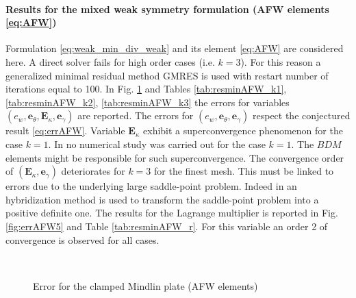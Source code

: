 \paragraph{Results for the mixed weak symmetry formulation (AFW elements \eqref{eq:AFW})} 
Formulation \eqref{eq:weak_min_div_weak} and its element \eqref{eq:AFW} are considered here. A direct solver fails for high order cases (i.e. $k=3$). For this reason a generalized minimal residual method GMRES \cite{saad1986gmres} is used with restart number of iterations equal to 100. In Fig. \ref{fig:errorAFW} and Tables \ref{tab:resminAFW_k1}, \ref{tab:resminAFW_k2}, \ref{tab:resminAFW_k3} the errors for variables $(e_w, \bm{e}_\theta, \bm{E}_\kappa, \bm{e}_\gamma)$  are reported. The errors for $(e_w, \bm{e}_\theta, \bm{e}_\gamma)$ respect the conjectured result \eqref{eq:errAFW}. Variable $\bm{E}_\kappa$ exhibit a superconvergence phenomenon for the case $k=1$. In \cite{arnold2014elastodynamics} no numerical study was carried out for the case $k=1$. The $BDM$ elements might be responsible for such superconvergence. The convergence order of $(\bm{E}_\kappa, \bm{e}_\gamma)$ deteriorates for $k=3$ for the finest mesh. This must be linked to errors due to the underlying large saddle-point problem. Indeed in \cite{arnold2014elastodynamics} an hybridization method is used to transform the saddle-point problem into a positive definite one. The results for the Lagrange multiplier is reported in Fig. \ref{fig:errAFW5} and Table \ref{tab:resminAFW_r}. For this variable an order 2 of convergence is observed for all cases.

\begin{figure}[h]%
	\centering
	\hspace{8pt}%
	 \\
	\hspace{8pt}%
	\caption{Error for the clamped Mindlin plate (AFW elements)}%
	\label{fig:errorAFW}%
\end{figure}





